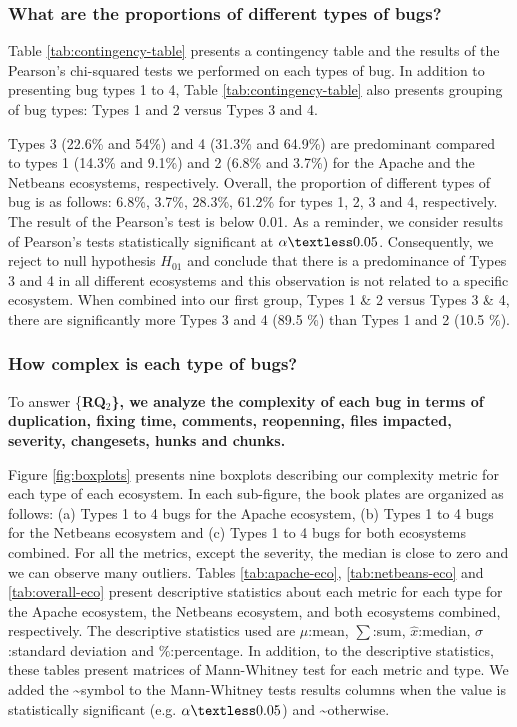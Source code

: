 \subsubsection{What are the proportions of different types of
bugs?}\label{what-are-the-proportions-of-different-types-of-bugs-1}



Table \ref{tab:contingency-table} presents a contingency table and the
results of the Pearson's chi-squared tests we performed on each types of
bug. In addition to presenting bug types 1 to 4, Table
\ref{tab:contingency-table} also presents grouping of bug types: Types 1
and 2 versus Types 3 and 4.

Types 3 (22.6\% and 54\%) and 4 (31.3\% and 64.9\%) are predominant
compared to types 1 (14.3\% and 9.1\%) and 2 (6.8\% and 3.7\%) for the
Apache and the Netbeans ecosystems, respectively. Overall, the
proportion of different types of bug is as follows: 6.8\%, 3.7\%,
28.3\%, 61.2\% for types 1, 2, 3 and 4, respectively. The result of the
Pearson's test is below 0.01. As a reminder, we consider results of
Pearson's tests statistically significant at \(\alpha \textless0.05\).
Consequently, we reject to null hypothesis \(H_{01}\) and conclude that
there is a predominance of Types 3 and 4 in all different ecosystems and
this observation is not related to a specific ecosystem. When combined
into our first group, Types 1 \& 2 versus Types 3 \& 4, there are
significantly more Types 3 and 4 (89.5 \%) than Types 1 and 2 (10.5 \%).

\subsubsection{How complex is each type of
bugs?}\label{how-complex-is-each-type-of-bugs-1}

To answer \{\bf RQ$_2$\}, we analyze the complexity of each bug in terms
of duplication, fixing time, comments, reopenning, files impacted,
severity, changesets, hunks and chunks.

Figure \ref{fig:boxplots} presents nine boxplots describing our
complexity metric for each type of each ecosystem. In each sub-figure,
the book plates are organized as follows: (a) Types 1 to 4 bugs for the
Apache ecosystem, (b) Types 1 to 4 bugs for the Netbeans ecosystem and
(c) Types 1 to 4 bugs for both ecosystems combined. For all the metrics,
except the severity, the median is close to zero and we can observe many
outliers. Tables \ref{tab:apache-eco}, \ref{tab:netbeans-eco} and
\ref{tab:overall-eco} present descriptive statistics about each metric
for each type for the Apache ecosystem, the Netbeans ecosystem, and both
ecosystems combined, respectively. The descriptive statistics used are
\(\mu\):mean, \(\sum\):sum, \(\hat{x}\):median, \(\sigma\):standard
deviation and \(\%\):percentage. In addition, to the descriptive
statistics, these tables present matrices of Mann-Whitney test for each
metric and type. We added the \checkmark\textasciitilde{}symbol to the
Mann-Whitney tests results columns when the value is statistically
significant (e.g. \(\alpha \textless 0.05\)) and
\xmark\textasciitilde{}otherwise.


